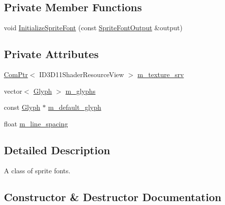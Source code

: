 \subsection*{Private Member Functions}
\begin{DoxyCompactItemize}
\item 
void \hyperlink{classmage_1_1_sprite_font_ae0edccbf98f4bd3b3195fa602baee121}{Initialize\+Sprite\+Font} (const \hyperlink{structmage_1_1_sprite_font_output}{Sprite\+Font\+Output} \&output)
\end{DoxyCompactItemize}
\subsection*{Private Attributes}
\begin{DoxyCompactItemize}
\item 
\hyperlink{namespacemage_ae74f374780900893caa5555d1031fd79}{Com\+Ptr}$<$ I\+D3\+D11\+Shader\+Resource\+View $>$ \hyperlink{classmage_1_1_sprite_font_a0f52f8845cb204d4ca3b3f3020df0029}{m\+\_\+texture\+\_\+srv}
\item 
vector$<$ \hyperlink{structmage_1_1_glyph}{Glyph} $>$ \hyperlink{classmage_1_1_sprite_font_acf4efc927a2ca3fc0eb297ed080ddfbb}{m\+\_\+glyphs}
\item 
const \hyperlink{structmage_1_1_glyph}{Glyph} $\ast$ \hyperlink{classmage_1_1_sprite_font_ad25667d3bfb539b71b39124fdc8ed6d6}{m\+\_\+default\+\_\+glyph}
\item 
float \hyperlink{classmage_1_1_sprite_font_a2b6de0c210a7cf5c72dd1bb69bff7a3b}{m\+\_\+line\+\_\+spacing}
\end{DoxyCompactItemize}


\subsection{Detailed Description}
A class of sprite fonts. 

\subsection{Constructor \& Destructor Documentation}
\hypertarget{classmage_1_1_sprite_font_ae9aaa257b25968d4681140c1594fc334}{}\label{classmage_1_1_sprite_font_ae9aaa257b25968d4681140c1594fc334} 
